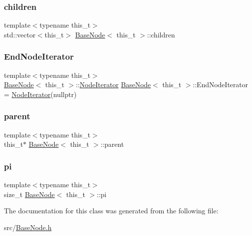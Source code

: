 \subsubsection{\texorpdfstring{children}{children}}
{\footnotesize\ttfamily template$<$typename this\+\_\+t$>$ \\
std\+::vector$<$this\+\_\+t$>$ \hyperlink{class_base_node}{Base\+Node}$<$ this\+\_\+t $>$\+::children\hspace{0.3cm}{\ttfamily [protected]}}

\mbox{\label{class_base_node_ac8a2fe45180446f4db2d4742c34b5b80}} 
\subsubsection{\texorpdfstring{End\+Node\+Iterator}{EndNodeIterator}}
{\footnotesize\ttfamily template$<$typename this\+\_\+t$>$ \\
\hyperlink{class_base_node}{Base\+Node}$<$ this\+\_\+t $>$\+::\hyperlink{class_base_node_1_1_node_iterator}{Node\+Iterator} \hyperlink{class_base_node}{Base\+Node}$<$ this\+\_\+t $>$\+::End\+Node\+Iterator = \hyperlink{class_base_node_1_1_node_iterator}{Node\+Iterator}(nullptr)\hspace{0.3cm}{\ttfamily [static]}}

\mbox{\label{class_base_node_aa1ad671f67931a82120d5852520417b7}} 
\subsubsection{\texorpdfstring{parent}{parent}}
{\footnotesize\ttfamily template$<$typename this\+\_\+t$>$ \\
this\+\_\+t$\ast$ \hyperlink{class_base_node}{Base\+Node}$<$ this\+\_\+t $>$\+::parent}

\mbox{\label{class_base_node_a6e2caf1ce4e3f0436c277b7331dbd554}} 
\subsubsection{\texorpdfstring{pi}{pi}}
{\footnotesize\ttfamily template$<$typename this\+\_\+t$>$ \\
size\+\_\+t \hyperlink{class_base_node}{Base\+Node}$<$ this\+\_\+t $>$\+::pi}



The documentation for this class was generated from the following file\+:\begin{DoxyCompactItemize}
\item 
src/\hyperlink{_base_node_8h}{Base\+Node.\+h}\end{DoxyCompactItemize}
